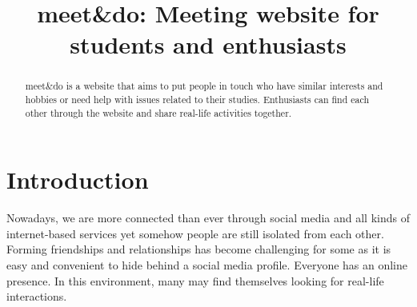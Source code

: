 \documentclass[conference]{IEEEtran}
\begin{document}
\title{meet\&do: Meeting website for students and enthusiasts\\}

\author{
\and
{}
\and
{}
\and
{}
}

\maketitle

\begin{abstract}
meet\&do is a website that aims to put people in touch who have similar interests and hobbies or need help with issues related to their studies. Enthusiasts can find each other through the website and share real-life activities together.
\end{abstract}

\section{Introduction}

Nowadays, we are more connected than ever through social media and all kinds of internet-based services yet somehow people are still isolated from each other. Forming friendships and relationships has become challenging for some as it is easy and convenient to hide behind a social media profile. Everyone has an online presence. In this environment, many may find themselves looking for real-life interactions.
\end{document}
